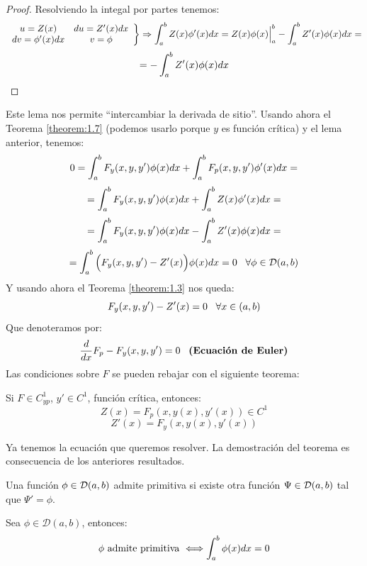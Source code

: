 \begin{proof}

Resolviendo la integal por partes tenemos:
\[
\left.\begin{array}{cc}
u=Z(x) & du=Z'(x)dx\\
dv=\phi'(x)dx & v=\phi
\end{array}\right\} \Rightarrow\displaystyle\int_{ a }^{ b } Z(x)\phi'(x)dx=Z(x)\phi(x)\Big|_a^b-\displaystyle\int_{ a }^{ b } Z'(x)\phi(x)dx=
\]
\[
=-\displaystyle\int_{ a }^{ b } Z'(x)\phi(x)dx
\]

\end{proof}

Este lema nos permite \enquote{intercambiar la derivada de sitio}.
Usando ahora el Teorema \ref{theorem:1.7} (podemos usarlo porque $y$ es función crítica) y el lema anterior, tenemos:
\[
0=\displaystyle\int_{ a }^{ b } F_y(x,y, y')\phi(x)dx+\displaystyle\int_{ a }^{ b } F_p(x,y,y')\phi'(x)dx= 
\]
\[
=\displaystyle\int_{ a }^{ b } F_y(x,y, y')\phi(x)dx+\displaystyle\int_{ a }^{ b } Z(x)\phi'(x)dx=
\]
\[
=\displaystyle\int_{ a }^{ b } F_y(x,y, y')\phi(x)dx-\displaystyle\int_{ a }^{ b } Z'(x)\phi(x)dx=
\]
\[
=\displaystyle\int_{ a }^{ b } \Big(F_y(x,y, y')-Z'(x)\Big)\phi(x)dx=0 \;\;\; \forall\phi\in\mathcal{D}(a,b)
\]
Y usando ahora el Teorema \ref{theorem:1.3} nos queda:
\[
F_y(x,y,y')-Z'(x)=0 \;\;\; \forall x \in(a,b)
\]
Que denoteramos por:
\[
\frac{d}{dx}F_p-F_y(x,y,y')=0 \;\;\; \textbf{(Ecuación de Euler)}
\]
Las condiciones sobre $F$ se pueden rebajar con el siguiente teorema:

\begin{theorem} 
\label{theorem:12}
Si $F\in C^1_{yp}$, $y'\in C^1$, función crítica, entonces:
\[
Z(x)=F_p(x,y(x),y'(x))\in C^1
\]
\[
Z'(x)=F_y(x,y(x),y'(x))
\]
\end{theorem}

Ya tenemos la ecuación que queremos resolver. La demostración del teorema es consecuencia de los anteriores resultados.

\begin{definition}
Una función $\phi\in\mathcal{D}(a,b)$ admite primitiva si existe otra función $\Psi\in\mathcal{D}(a,b)$ tal que $\Psi'=\phi$. 
\end{definition}

\begin{lemma}
\label{lemma:13}
Sea $\phi\in\mathcal{D}(a,b)$, entonces:
\[
\phi \text{ admite primitiva } \Longleftrightarrow \displaystyle\int_{ a }^{ b } \phi(x)dx=0
\]
\end{lemma}

